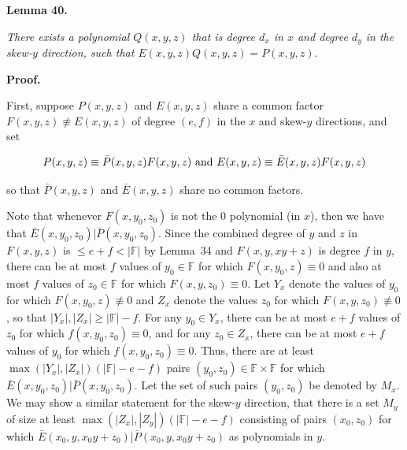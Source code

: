 

\par\medskip\noindent\textbf{
\textbf{Lemma 40}\textbf{.}
}\par



\emph{There exists a polynomial $Q(x,y,z)$ that is degree $d_{x}$ in $x$ and degree $d_{y}$ in the skew-$y$ direction, such that $E(x,y,z)Q(x,y,z)=P(x,y,z).$}\par







\par\medskip\noindent\textbf{Proof.}\par




First, suppose $P(x,y,z)$ and $E(x,y,z)$ share a common factor $F(x,y,z)\not\equiv E(x,y,z)$ of degree $(e,f)$ in the $x$ and skew-$y$ directions, and set\par


\[\begin{gathered}
P(x,y,z)\equiv\bar{P}(x,y,z)F(x,y,z)\nobreak\ \text{and}\nobreak\ E(x,y,z)\equiv\bar{E}(x,y,z)F(x,y,z)
\end{gathered}\]


so that $\bar{P}(x,y,z)$ and $\bar{E}(x,y,z)$ share no common factors.\par




Note that whenever $F(x,y_{0},z_{0})$ is not the $0$ polynomial (in $x$), then we have that $\bar{E}(x,y_{0},z_{0})|\bar{P}(x,y_{0},z_{0})$. Since the combined degree of $y$ and $z$ in $F(x,y,z)$ is $\leq e+f<|\mathbb{F}|$ by Lemma 34 and $F(x,y,xy+z)$ is degree $f$ in $y$, there can be at most $f$ values of $y_{0}\in\mathbb{F}$ for which $F(x,y_{0},z)\equiv 0$ and also at most $f$ values of $z_{0}\in\mathbb{F}$ for which $F(x,y,z_{0})\equiv 0$. Let $Y_{x}$ denote the values of $y_{0}$ for which $F(x,y_{0},z)\not\equiv 0$ and $Z_{x}$ denote the values $z_{0}$ for which $F(x,y,z_{0})\not\equiv 0$, so that $|Y_{x}|,|Z_{x}|\geq|\mathbb{F}|-f$. For any $y_{0}\in Y_{x}$, there can be at most $e+f$ values of $z_{0}$ for which $f(x,y_{0},z_{0})\equiv 0$, and for any $z_{0}\in Z_{x}$, there can be at most $e+f$ values of $y_{0}$ for which $f(x,y_{0},z_{0})\equiv 0$. Thus, there are at least $\max(|Y_{x}|,|Z_{x}|)(|\mathbb{F}|-e-f)$ pairs $(y_{0},z_{0})\in\mathbb{F}\times\mathbb{F}$ for which $\bar{E}(x,y_{0},z_{0})|\bar{P}(x,y_{0},z_{0})$. Let the set of such pairs $(y_{0},z_{0})$ be denoted by $M_{x}$. We may show a similar statement for the skew-$y$ direction, that there is a set $M_{y}$ of size at least $\max(|Z_{x}|,|Z_{y}|)(|\mathbb{F}|-e-f)$ consisting of pairs $(x_{0},z_{0})$ for which $\bar{E}(x_{0},y,x_{0}y+z_{0})|\bar{P}(x_{0},y,x_{0}y+z_{0})$ as polynomials in $y$.\par




